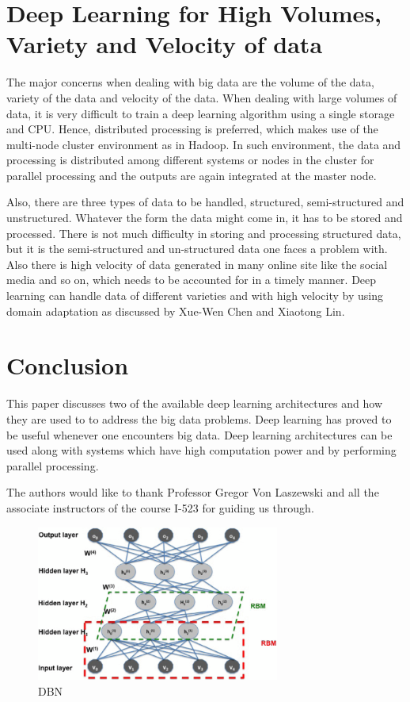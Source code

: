 \documentclass[sigconf]{acmart}
\begin{document}
\section{Deep Learning for High Volumes, Variety and Velocity of data}
The major concerns when dealing with big data are the volume of the data, variety of the data and velocity of the data. When dealing with large volumes of data, it is very difficult to train a deep learning algorithm using a single storage and CPU. Hence, distributed processing is preferred, which makes use of the multi-node cluster environment as in Hadoop. In such environment, the data and processing is distributed among different systems or nodes in the cluster for parallel processing and the outputs are again integrated at the master node.

Also, there are three types of data to be handled, structured, semi-structured and unstructured. Whatever the form the data might come in, it has to be stored and processed. There is not much difficulty in storing and processing structured data, but it is the semi-structured and un-structured data one faces a problem with. Also there is high velocity of data generated in many online site like the social media and so on, which needs to be accounted for in a timely manner. Deep learning can handle data of different varieties and with high velocity by using domain adaptation as discussed by Xue-Wen Chen and Xiaotong Lin.\cite{Chen2014}

\section{Conclusion}
This paper discusses two of the available deep learning architectures and how they are used to to address the big data problems. Deep learning has proved to be useful whenever one encounters big data. Deep learning architectures can be used along with systems which have high computation power and by performing parallel processing. 

\begin{acks}

  The authors would like to thank Professor Gregor Von Laszewski and all the associate instructors of the course I-523 for guiding us through.
\end{acks}





\begin{figure}[htp]
\centering
\includegraphics[width=80mm]{images/paper1-fig1.png}
\caption{DBN}
\label{fig:1}
\end{figure}
\end{document}
